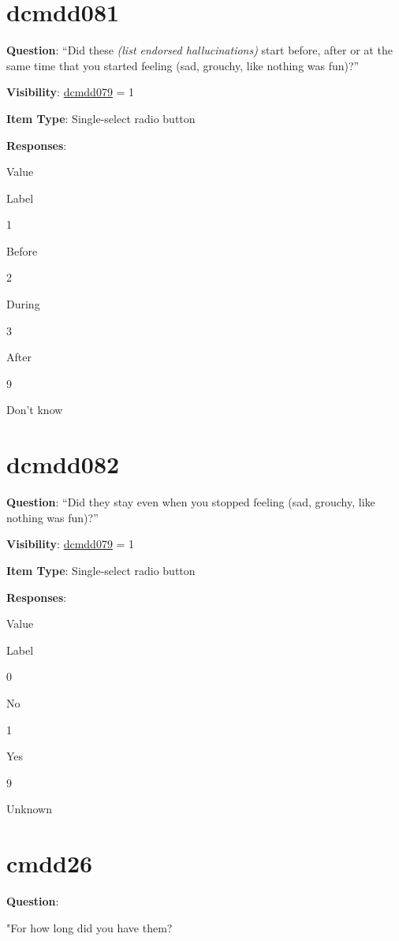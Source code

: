 \documentclass[
]{book}
\begin{document}
\hypertarget{dcmdd081}{%
\section{dcmdd081}\label{dcmdd081}}

\textbf{Question}: ``Did these \emph{(list endorsed hallucinations)} start before, after or at the same time that you started feeling (sad, grouchy, like nothing was fun)?''

\textbf{Visibility}: \protect\hyperlink{dcmdd079}{dcmdd079} = 1

\textbf{Item Type}: Single-select radio button

\textbf{Responses}:

Value

Label

1

Before

2

During

3

After

9

Don't know

\hypertarget{dcmdd082}{%
\section{dcmdd082}\label{dcmdd082}}

\textbf{Question}: ``Did they stay even when you stopped feeling (sad, grouchy, like nothing was fun)?''

\textbf{Visibility}: \protect\hyperlink{dcmdd079}{dcmdd079} = 1

\textbf{Item Type}: Single-select radio button

\textbf{Responses}:

Value

Label

0

No

1

Yes

9

Unknown

\hypertarget{cmdd26}{%
\section{cmdd26}\label{cmdd26}}

\textbf{Question}:

"For how long did you have them?
\end{document}
